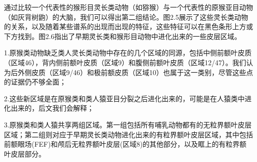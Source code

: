 通过比较一个代表性的猴形目灵长类动物（如猕猴）与一个代表性的原猴亚目动物（如灰背树鼩）的大脑，我们可以得出第二组结论。图2.5展示了这些灵长类动物的关系，以及随着某些谱系的出现而出现的特征，这些特征可以在黑色条形上方或下方找到。图2.6指出了早期灵长类和猴形目动物中进化出来的一些皮层区域。\par
1.原猴类动物缺乏类人灵长类动物中存在的几个区域的同源，包括中侧前额叶皮质（区域46），背内侧前额叶皮质（区域9）和腹侧前额叶皮质（区域12/47）。我们认为后外侧皮质（区域9/46）和极前额皮质（区域10）也属于这一类别，尽管这些点的证据仍不够全面；\par
2.这些新区域是在原猴类和类人猿亚目分裂之后进化出来的，可能是在人猿类中进化出来的，后文我们会解释；\par
3.原猴类和类人猿共享两组区域。第一组包括所有哺乳动物都有的无粒界额叶皮层区域；第二组则对应于早期灵长类动物进化出来的有粒界额叶皮层区域，其中包括前额眼场(FEF)和颅后无粒界额叶皮层(区域8)的其他部分，以及眶上的有粒界额叶皮层部分。


